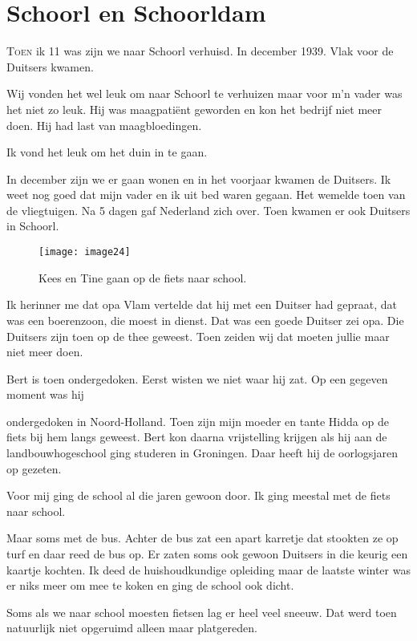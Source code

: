 \chapter*{Schoorl en Schoorldam}

\lettrine[lines=2, loversize=0.3, lraise=0]{\initfamily T}{oen } ik 11 was zijn we naar Schoorl verhuisd. In december 1939. Vlak voor de Duitsers kwamen.

Wij vonden het wel leuk om naar Schoorl te verhuizen maar voor m’n vader was het niet zo leuk. Hij was maagpati\"{e}nt geworden en kon het bedrijf niet meer doen. Hij had last van maagbloedingen. 

Ik vond het leuk om het duin in te gaan.


In december zijn we er gaan wonen en in het voorjaar kwamen de Duitsers. Ik weet nog goed dat mijn vader en ik uit bed waren gegaan. Het wemelde toen van de vliegtuigen. Na 5 dagen gaf Nederland zich over. Toen kwamen er ook Duitsers in Schoorl. 

\begin{figure}[h]
    \texttt{[image: image24]}
    \caption{Kees en Tine gaan op de fiets naar school.}
\end{figure}

Ik herinner me dat opa Vlam vertelde dat hij met een Duitser had gepraat, dat was een boerenzoon, die moest in dienst. Dat was een goede Duitser zei opa. Die Duitsers zijn toen op de thee geweest. Toen zeiden wij dat moeten jullie maar niet meer doen.

Bert is toen ondergedoken. Eerst wisten we niet waar hij zat. Op een gegeven moment was hij 

ondergedoken in Noord-Holland. Toen zijn mijn moeder en tante Hidda op de fiets bij hem langs geweest. Bert kon daarna vrijstelling krijgen als hij aan de landbouwhogeschool ging studeren in Groningen. Daar heeft hij de oorlogsjaren op gezeten. 

Voor mij ging de school al die jaren gewoon door. Ik ging meestal met de fiets naar school.

Maar soms met de bus. Achter de bus zat een apart karretje dat stookten ze op turf en daar reed de bus op. Er zaten soms ook gewoon Duitsers in die keurig een kaartje kochten. Ik deed de huishoudkundige opleiding maar de laatste winter was er niks meer om mee te koken en ging de school ook dicht.

Soms als we naar school moesten fietsen lag er heel veel sneeuw. Dat werd toen natuurlijk niet opgeruimd alleen maar platgereden.

